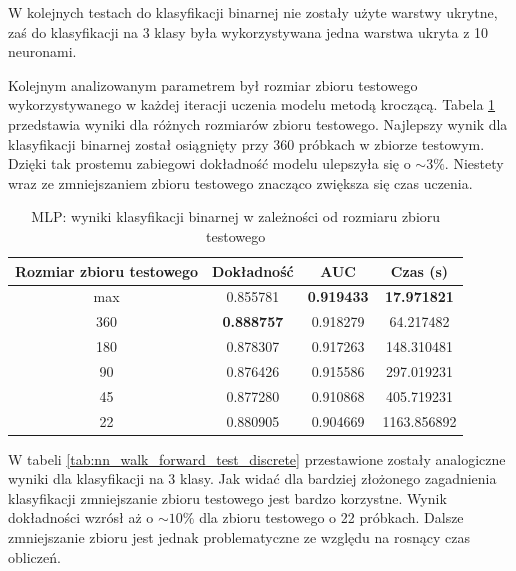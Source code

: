 \documentclass[a4paper, twoside, 11pt, openright]{article}
\begin{document}
W kolejnych testach do klasyfikacji binarnej nie zostały użyte warstwy ukrytne, zaś do klasyfikacji na 3 klasy była wykorzystywana jedna warstwa ukryta z 10 neuronami.

\bigskip

Kolejnym analizowanym parametrem był rozmiar zbioru testowego wykorzystywanego w każdej iteracji uczenia modelu metodą kroczącą. Tabela \ref{tab:nn_walk_forward_test_binary} przedstawia wyniki dla różnych rozmiarów zbioru testowego. Najlepszy wynik dla klasyfikacji binarnej został osiągnięty przy 360 próbkach w zbiorze testowym. Dzięki tak prostemu zabiegowi dokładność modelu ulepszyła się o $\sim 3\%$. Niestety wraz ze zmniejszaniem zbioru testowego znacząco zwiększa się czas uczenia. 

\begin{table}[H]
    \centering
    \begin{tabular}{|c|c|c|c|}
    \hline
        \textbf{Rozmiar zbioru testowego} & \textbf{Dokładność} &  \textbf{AUC} &  \textbf{Czas (s)} \\ \hline 
max                           &  0.855781 &  \textbf{0.919433} &   \textbf{17.971821} \\  \hline
360                         &  \textbf{0.888757} &  0.918279 &   64.217482 \\  \hline
180                         &  0.878307 &  0.917263 &  148.310481 \\  \hline
90                          &  0.876426 &  0.915586 &  297.019231 \\ \hline
45                          &  0.877280 &  0.910868 &   405.719231 \\ \hline
22                          &  0.880905 &  0.904669 &  1163.856892 \\ \hline
    \end{tabular}
    \caption{MLP: wyniki klasyfikacji binarnej w zależności od rozmiaru zbioru testowego}
    \label{tab:nn_walk_forward_test_binary}
\end{table}

W tabeli \ref{tab:nn_walk_forward_test_discrete} przestawione zostały analogiczne wyniki dla klasyfikacji na 3 klasy. Jak widać dla bardziej złożonego zagadnienia klasyfikacji zmniejszanie zbioru testowego jest bardzo korzystne. Wynik dokładności wzrósł aż o $\sim 10\%$ dla zbioru testowego o 22 próbkach. Dalsze zmniejszanie zbioru jest jednak problematyczne ze względu na rosnący czas obliczeń.
\end{document}
